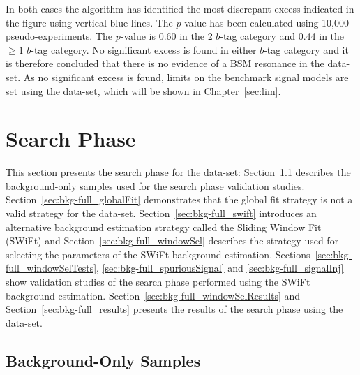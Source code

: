In both cases the \bh{} algorithm has identified the most discrepant excess indicated
in the figure using vertical blue lines.
The \bh{} \mbox{$p$-value} has been calculated using 10,000 pseudo-experiments.
The \bh{} \mbox{$p$-value} is 0.60 in the 2 $b$-tag category
and 0.44 in the $\geq1$ $b$-tag category.
No significant excess is found in either $b$-tag category and it is therefore concluded
that there is no evidence of a BSM resonance in the \summer{} data-set.
As no significant excess is found, limits on the benchmark signal models are set using the \summer{} data-set,
which will be shown in Chapter~\ref{sec:lim}.

\clearpage
\section{\lm{} Search Phase}
\label{sec:bkg-full}

This section presents the search phase for the \lm{} data-set:
Section~\ref{sec:bkg-full_fitCR} describes the background-only samples used for the search phase validation studies.
Section~\ref{sec:bkg-full_globalFit} demonstrates that the global fit strategy is not a valid strategy for the \lm{} data-set.
Section~\ref{sec:bkg-full_swift} introduces an alternative background estimation strategy called the Sliding Window Fit (SWiFt)
and Section~\ref{sec:bkg-full_windowSel} describes the strategy used for selecting the parameters of the SWiFt background estimation.
Sections~\ref{sec:bkg-full_windowSelTests}, \ref{sec:bkg-full_spuriousSignal} and \ref{sec:bkg-full_signalInj} show validation studies
of the search phase performed using the SWiFt background estimation.
Section~\ref{sec:bkg-full_windowSelResults} and Section~\ref{sec:bkg-full_results} presents the results of the search phase using the \lm{} data-set.

\subsection{Background-Only Samples}
\label{sec:bkg-full_fitCR}


